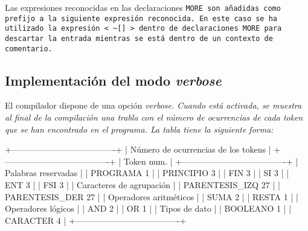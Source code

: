 
Las expresiones reconocidas en las declaraciones \tt{MORE} son añadidas como prefijo a la siguiente expresión reconocida. En este caso se ha utilizado la expresión \verb|< ~[] >| dentro de declaraciones \tt{MORE} para descartar la entrada mientras se está dentro de un contexto de comentario.

\subsection{Implementación del modo \it{verbose}}
El compilador dispone de una opción \it{verbose}. Cuando está activada, se muestra al final de la compilación una trabla con el número de ocurrencias de cada token que se han encontrado en el programa. La tabla tiene la siguiente forma:

\begin{codigo}[xleftmargin=3.5cm]
 +-------------------------------------+
 | Número de ocurrencias de los tokens |
 +-------------------------------------+
 | Token                         num.      |
 +-------------------------------------+
 | Palabras reservadas                     |
 |     PROGRAMA                     1      |
 |     PRINCIPIO                    3      |
 |     FIN                          3      |
 |     SI                           3      |
 |     ENT                          3      |
 |     FSI                          3      |
 | Caracteres de agrupación                |
 |     PARENTESIS_IZQ              27      |
 |     PARENTESIS_DER              27      |
 | Operadores aritméticos                  |
 |     SUMA                         2      |
 |     RESTA                        1      |
 | Operadores lógicos                      |
 |     AND                          2      |
 |     OR                           1      |
 | Tipos de dato                           |
 |     BOOLEANO                     1      |
 |     CARACTER                     4      |
 +-------------------------------------+
\end{codigo}

